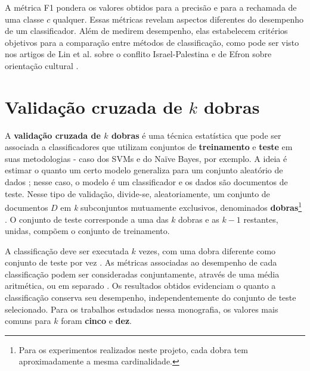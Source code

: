 A métrica F1 pondera os valores obtidos para a precisão e para a rechamada de uma classe \ensuremath{c} qualquer. Essas métricas revelam aspectos diferentes do desempenho de um classificador. Além de medirem desempenho, elas estabelecem critérios objetivos para a comparação entre métodos de classificação, como pode ser visto nos artigos de Lin et al. sobre o conflito Israel-Palestina \cite{lin-et-al2006} e de Efron sobre orientação cultural \cite{efron}. 


\section{Validação cruzada de \ensuremath{k} dobras}
\label{validacao}

A \textbf{validação cruzada de \ensuremath{k} dobras} é uma técnica estatística que pode ser associada a classificadores que utilizam conjuntos de \textbf{treinamento} e \textbf{teste} em suas metodologias - caso dos SVMs e do Naïve Bayes, por exemplo. A ideia é estimar o quanto um certo modelo generaliza para um conjunto aleatório de dados \cite{payam-leitang}; nesse caso, o modelo é um classificador e os dados são documentos de teste. Nesse tipo de validação, divide-se, aleatoriamente, um conjunto de documentos \ensuremath{D} em \emph{k} subconjuntos mutuamente exclusivos, denominados \textbf{dobras}\footnote{Para os experimentos realizados neste projeto, cada dobra tem aproximadamente a mesma cardinalidade.} \cite{ron-kohavi}. O conjunto de teste corresponde a uma das \ensuremath{k} dobras e as \ensuremath{k - 1} restantes, unidas, compõem o conjunto de treinamento.

A classificação deve ser executada \ensuremath{k} vezes, com uma dobra diferente como conjunto de teste por vez \cite{ron-kohavi}. As métricas associadas ao desempenho de cada classificação podem ser consideradas conjuntamente, através de uma média aritmética, ou em separado \cite{payam-leitang}. Os resultados obtidos evidenciam o quanto a classificação conserva seu desempenho, independentemente do conjunto de teste selecionado. Para os trabalhos estudados nessa monografia, os valores mais comuns para \ensuremath{k} foram \textbf{cinco} e \textbf{dez}. 


